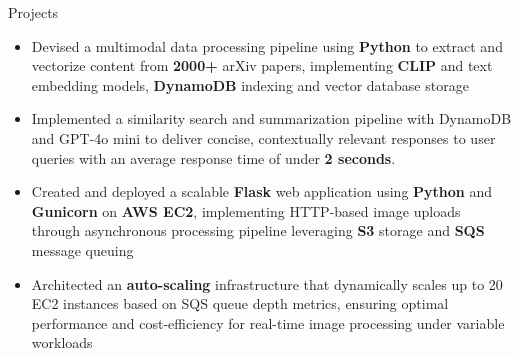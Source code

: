 \documentclass{resume}
\begin{document}
\begin{experienceSection}{Projects}

    \projectItem[
        title=RAG Implementation for arXiv Papers,
        duration={Nov 2024},
    ]
    \begin{itemize}
        \vspace{-0.5em}
        \itemsep -6pt {}
        \item Devised a multimodal data processing pipeline using \textbf{Python} to extract and vectorize content from \textbf{2000+} arXiv papers, implementing \textbf{CLIP} and text embedding models, \textbf{DynamoDB} indexing and vector database storage
        \item Implemented a similarity search and summarization pipeline with DynamoDB and GPT-4o mini to deliver concise, contextually relevant responses to user queries with an average response time of under \textbf{2 seconds}.
    \end{itemize}

    
    \projectItem[
        title=AWS-Based Face Recognition App,
        duration={May 2024},
    ]
    \begin{itemize}
        \vspace{-0.5em}
        \itemsep -6pt {}
        \item Created and deployed a scalable \textbf{Flask} web application using \textbf{Python} and \textbf{Gunicorn} on\textbf{ AWS EC2}, implementing HTTP-based image uploads through asynchronous processing pipeline leveraging \textbf{S3} storage and \textbf{SQS} message queuing
        \item Architected an \textbf{auto-scaling} infrastructure that dynamically scales up to 20 EC2 instances based on SQS queue depth metrics, ensuring optimal performance and cost-efficiency for real-time image processing under variable workloads
    \end{itemize}

\end{experienceSection}
\end{document}
